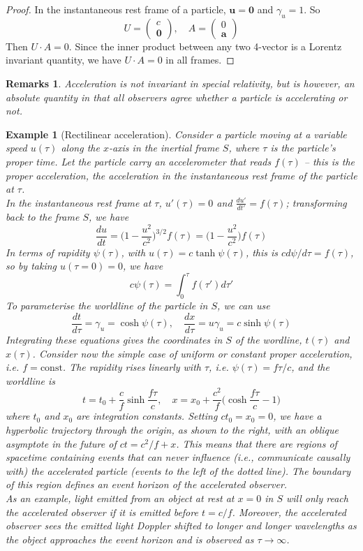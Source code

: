 \documentclass[a4paper]{article}
\newtheorem{eg}{Example}[section]
\newtheorem{remarks}{Remarks}[section]
\theoremstyle{new}
\begin{document}
\begin{proof}
In the instantaneous rest frame of a particle, $\mathbf{u} = \mathbf{0}$ and $\gamma_u = 1$. So
$$U =
  \begin{pmatrix}
    c\\
    \mathbf{0}
  \end{pmatrix}, \quad
  A =
  \begin{pmatrix}
    0\\
    \mathbf{a}
  \end{pmatrix}$$
Then $U\cdot A = 0$. Since the inner product between any two 4-vector is a Lorentz invariant quantity, we have $U\cdot A = 0$ in all frames.
\end{proof}
\begin{remarks}
Acceleration is not invariant in special relativity, but is however, an absolute quantity in that all observers agree whether a particle is accelerating or not.
\end{remarks}
\begin{eg}[Rectilinear acceleration]
Consider a particle moving at a variable speed $u(\tau)$ along the $x$-axis in the inertial frame $S$, where $\tau$ is the particle’s proper time. Let the particle carry an accelerometer that reads $f(\tau)$ – this is the proper acceleration, the acceleration in the instantaneous rest frame of the particle at $\tau$.\\[5pt]
In the instantaneous rest frame at $\tau$, $u'(\tau)=0$ and $\frac{du'}{dt'}=f(\tau)$; transforming back to the frame $S$, we have
$$\frac{du}{dt}=\bigg(1-\frac{u^2}{c^2}\bigg)^{3/2}f(\tau)=\bigg(1-\frac{u^2}{c^2}\bigg)f(\tau)$$
In terms of rapidity $\psi(\tau)$, with $u(\tau)=c\tanh\psi(\tau)$, this is $cd\psi/d\tau=f(\tau)$, so by taking $u(\tau=0)=0$, we have
$$c\psi(\tau)=\int_0^\tau f(\tau')d\tau'$$
To parameterise the worldline of the particle in $S$, we can use
$$\frac{dt}{d\tau}=\gamma_u=\cosh\psi(\tau),\quad\frac{dx}{d\tau}=u\gamma_u=c\sinh\psi(\tau)$$
Integrating these equations gives the coordinates in $S$ of the wordline, $t(\tau)$ and $x(\tau)$. Consider now the simple case of uniform or constant proper acceleration, i.e. $f=\text{const}$. The rapidity rises linearly with $\tau$, i.e. $\psi(\tau)=f\tau/c$, and the worldline is
$$t=t_0+\frac{c}{f}\sinh\frac{f\tau}{c},\quad x=x_0+\frac{c^2}{f}\bigg(\cosh\frac{f\tau}{c}-1\bigg)$$
where $t_0$ and $x_0$ are integration constants. Setting $ct_0=x_0=0$, we have a hyperbolic trajectory through the origin, as shown to the right, with an oblique asymptote in the future of $ct = c^2/f + x$. This means that there are regions of spacetime containing events that can never influence (i.e., communicate causally with) the accelerated particle (events to the left of the dotted line). The boundary of this region defines an event horizon of the accelerated observer.\\[5pt]
As an example, light emitted from an object at rest at $x = 0$ in $S$ will only reach the accelerated observer if it is emitted before $t = c/f$. Moreover, the accelerated observer sees the emitted light Doppler shifted to longer and longer wavelengths as the object approaches the event horizon and is observed as $\tau\rightarrow\infty$.
\end{eg}
\end{document}
